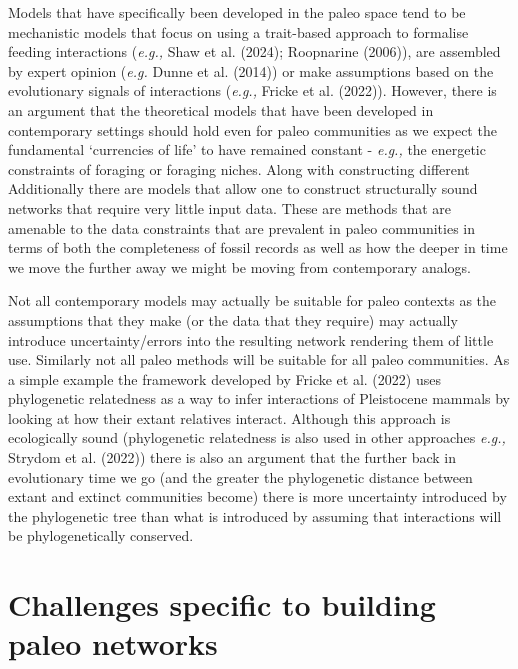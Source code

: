 \documentclass[
]{article}
\begin{document}
Models that have specifically been developed in the paleo space tend to
be mechanistic models that focus on using a trait-based approach to
formalise feeding interactions (\emph{e.g.,} Shaw et al. (2024);
Roopnarine (2006)), are assembled by expert opinion (\emph{e.g.} Dunne
et al. (2014)) or make assumptions based on the evolutionary signals of
interactions (\emph{e.g.,} Fricke et al. (2022)). However, there is an
argument that the theoretical models that have been developed in
contemporary settings should hold even for paleo communities as we
expect the fundamental `currencies of life' to have remained constant -
\emph{e.g.,} the energetic constraints of foraging or foraging niches.
Along with constructing different Additionally there are models that
allow one to construct structurally sound networks that require very
little input data. These are methods that are amenable to the data
constraints that are prevalent in paleo communities in terms of both the
completeness of fossil records as well as how the deeper in time we move
the further away we might be moving from contemporary analogs.

Not all contemporary models may actually be suitable for paleo contexts
as the assumptions that they make (or the data that they require) may
actually introduce uncertainty/errors into the resulting network
rendering them of little use. Similarly not all paleo methods will be
suitable for all paleo communities. As a simple example the framework
developed by Fricke et al. (2022) uses phylogenetic relatedness as a way
to infer interactions of Pleistocene mammals by looking at how their
extant relatives interact. Although this approach is ecologically sound
(phylogenetic relatedness is also used in other approaches \emph{e.g.,}
Strydom et al. (2022)) there is also an argument that the further back
in evolutionary time we go (and the greater the phylogenetic distance
between extant and extinct communities become) there is more uncertainty
introduced by the phylogenetic tree than what is introduced by assuming
that interactions will be phylogenetically conserved.

\section{Challenges specific to building paleo
networks}\label{challenges-specific-to-building-paleo-networks}
\end{document}
